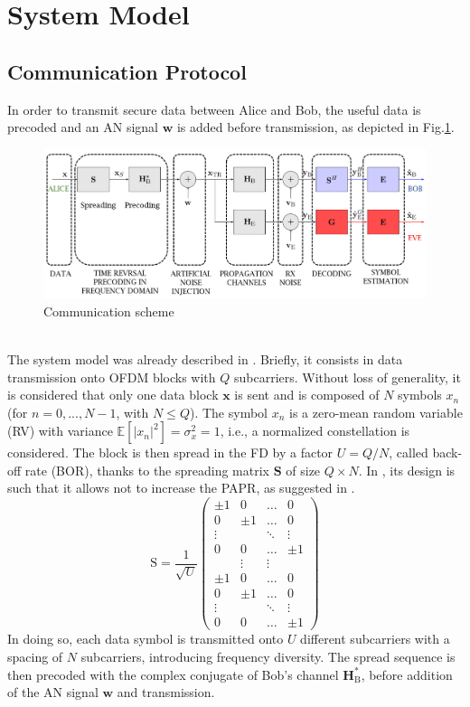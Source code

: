 \documentclass[journal,comsoc]{IEEEtran}
\let\MYoriglatexcaption\caption
\renewcommand{\caption}[2][\relax]{\MYoriglatexcaption[#2]{#2}}
\newcommand{\EX}[1]{\mathbb{E} \left[#1\right]}%
\newcommand{\HB}{\textbf{H}_{\text{B}}}
\newcommand{\spread}{\textbf{S}}
\newcommand{\w}{\textbf{w}}
\newcommand{\mat}[1]{\boldsymbol{\mathrm{#1}}}
\begin{document}
\section{System Model}\label{sec:system-model}


\subsection{Communication Protocol}\label{sec:communication-protocol}
In order to transmit secure data between Alice and Bob, the useful data is precoded and an AN signal $\w$ is added before transmission, as depicted in Fig.\ref{fig_com_scheme}.  
\begin{figure}[h!t]
	\centering
	\includegraphics[width=1\linewidth]{graphs/com_scheme_an.PNG}
	\caption{Communication scheme}
	\label{fig_com_scheme}
\end{figure}\\
The system model was already described in \cite{9049811}. Briefly, it consists in data transmission onto OFDM blocks with $Q$ subcarriers. Without loss of generality, it is considered that only one data block $\textbf{x}$ is sent and is composed of $N$ symbols $x_n$ (for $n = 0,..., N-1$, with $N\leq Q$). The symbol $x_n$ is  a zero-mean random variable (RV) with variance $\EX{|x_n|^2} = \sigma_x^2 = 1$, i.e., a normalized constellation is considered. The block is then spread in the FD by a factor $U = Q/N$, called back-off rate (BOR), thanks to the spreading matrix $\spread$ of size $Q\times N$. In \cite{9049811}, its design is such that it allows not to increase the PAPR, as suggested in \cite{4394231}.
\begin{equation}
\mat{S} = \frac{1}{\sqrt{U}} 
\begin{pmatrix}
\pm 1 & 0 & \hdots & 0 \\
0 & \pm 1 & \hdots & 0 \\
\vdots & & \ddots & \vdots \\
0 & 0 & \hdots & \pm 1 \\
& \vdots& \vdots& \\
\pm 1 & 0 & \hdots & 0 \\
0 & \pm 1 & \hdots & 0 \\
\vdots & & \ddots & \vdots \\
0 & 0 & \hdots & \pm 1
\end{pmatrix}
\label{eq:spread_mat}
\end{equation}
In doing so, each data symbol is transmitted onto $U$ different subcarriers with a spacing of $N$ subcarriers, introducing frequency diversity. The spread sequence is then precoded with the complex conjugate of Bob's channel $\HB^*$, before addition of the AN signal $\textbf{w}$  and transmission. 
\end{document}
